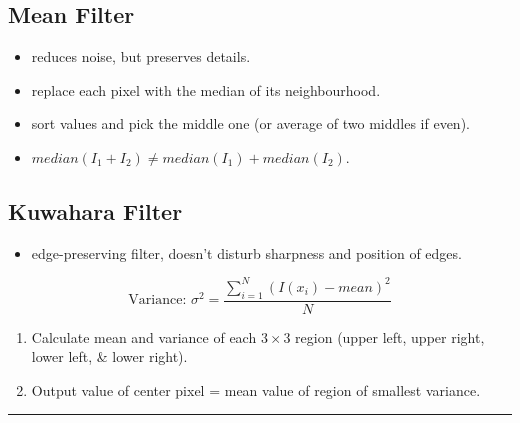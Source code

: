 \subsection{Mean Filter}
\begin{itemize}
  \item reduces noise, but preserves details.
  \item replace each pixel with the median of its neighbourhood.
  \item sort values and pick the middle one (or average of two middles if even).
  \item $median(I_1+I_2)\neq median(I_1)+median(I_2)$.
\end{itemize}
\subsection{Kuwahara Filter}
\begin{itemize}
  \item edge-preserving filter, doesn't disturb sharpness and position of edges.
\end{itemize}
\[
    \text{Variance: }\sigma^2 = \frac{\sum_{i=1}^{N}{(I(x_i) - mean)^2}}{N}
\]
\begin{enumerate}
  \item Calculate mean and variance of each $3 \times 3$ region (upper left, upper right, lower left, \& lower right).
  \item Output value of center pixel = mean value of region of smallest variance.
\end{enumerate}
\hrule
